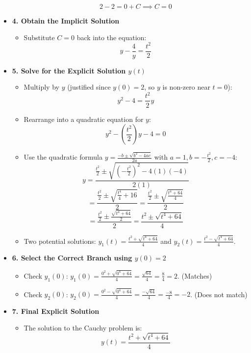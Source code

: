 \begin{cascade}
\begin{itemize}
\begin{itemize}
			            $$ 2 - 2 = 0 + C \implies C = 0 $$
		      \end{itemize}
		\item \textbf{4. Obtain the Implicit Solution}
		      \begin{itemize}
			      \item Substitute $C=0$ back into the equation:
			            $$ y - \frac{4}{y} = \frac{t^2}{2} $$
		      \end{itemize}
		\item \textbf{5. Solve for the Explicit Solution $y(t)$}
		      \begin{itemize}
			      \item Multiply by $y$ (justified since $y(0)=2$, so $y$ is non-zero near $t=0$):
			            $$ y^2 - 4 = \frac{t^2}{2} y $$
			      \item Rearrange into a quadratic equation for $y$:
			            $$ y^2 - \left(\frac{t^2}{2}\right)y - 4 = 0 $$
			      \item Use the quadratic formula $y = \frac{-b \pm \sqrt{b^2 - 4ac}}{2a}$ with $a=1, b=-\frac{t^2}{2}, c=-4$:
			            $$ y = \frac{\frac{t^2}{2} \pm \sqrt{\left(-\frac{t^2}{2}\right)^2 - 4(1)(-4)}}{2(1)} $$
			            $$ = \frac{\frac{t^2}{2} \pm \sqrt{\frac{t^4}{4} + 16}}{2} = \frac{\frac{t^2}{2} \pm \sqrt{\frac{t^4 + 64}{4}}}{2} $$
			            $$ = \frac{\frac{t^2}{2} \pm \frac{\sqrt{t^4 + 64}}{2}}{2} = \frac{t^2 \pm \sqrt{t^4 + 64}}{4} $$
			      \item Two potential solutions: $y_1(t) = \frac{t^2 + \sqrt{t^4 + 64}}{4}$ and $y_2(t) = \frac{t^2 - \sqrt{t^4 + 64}}{4}$.
		      \end{itemize}
		\item \textbf{6. Select the Correct Branch using $y(0)=2$}
		      \begin{itemize}
			      \item Check $y_1(0)$: $y_1(0) = \frac{0^2 + \sqrt{0^4 + 64}}{4} = \frac{\sqrt{64}}{4} = \frac{8}{4} = 2$. (Matches)
			      \item Check $y_2(0)$: $y_2(0) = \frac{0^2 - \sqrt{0^4 + 64}}{4} = \frac{-\sqrt{64}}{4} = \frac{-8}{4} = -2$. (Does not match)
		      \end{itemize}
		\item \textbf{7. Final Explicit Solution}
		      \begin{itemize}
			      \item The solution to the Cauchy problem is:
			            $$ y(t) = \frac{t^2 + \sqrt{t^4 + 64}}{4} $$
		      \end{itemize}
	\end{itemize}
\end{cascade}

